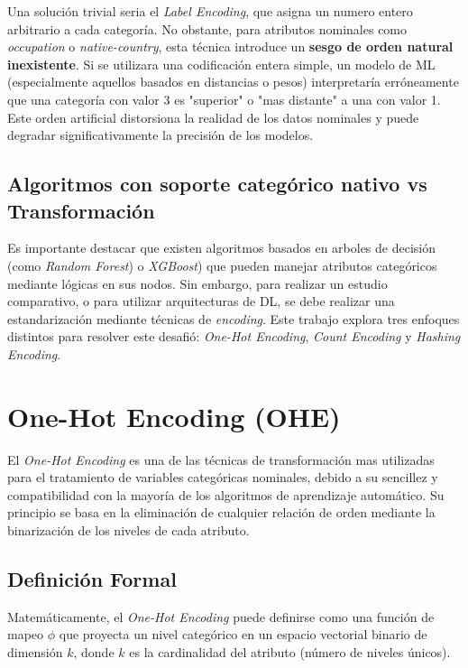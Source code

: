 \documentclass[a4paper,10pt]{book}
\begin{document}
		Una solución trivial seria el \textit{Label Encoding}, que asigna un numero entero arbitrario a cada categoría. No obstante, para atributos nominales como \textit{occupation} o \textit{native-country}, esta técnica introduce un \textbf{sesgo de orden natural inexistente}.
		Si se utilizara una codificación entera simple, un modelo de ML (especialmente aquellos basados en distancias o pesos) interpretaría erróneamente que una categoría con valor 3 es "superior" o "mas distante" a una con valor 1. Este orden artificial distorsiona la realidad de los datos nominales y puede degradar significativamente la precisión de los modelos.
	
	\subsection{Algoritmos con soporte categórico nativo vs Transformación}
	
		Es importante destacar que existen algoritmos basados en arboles de decisión (como \textit{Random Forest}) o \textit{XGBoost}) que pueden manejar atributos categóricos mediante lógicas en sus nodos. Sin embargo, para realizar un estudio comparativo, o para utilizar arquitecturas de DL, se debe realizar una estandarización mediante técnicas de \textit{encoding}.
		Este trabajo explora tres enfoques distintos para resolver este desafió: \textit{One-Hot Encoding}, \textit{Count Encoding} y \textit{Hashing Encoding}.
		
	\section{One-Hot Encoding (OHE)}
	
		El \textit{One-Hot Encoding} es una de las técnicas de transformación mas utilizadas para el tratamiento de variables categóricas nominales, debido a su sencillez y compatibilidad con la mayoría de los algoritmos de aprendizaje automático. Su principio se basa en la eliminación de cualquier relación de orden mediante la binarización de los niveles de cada atributo.
	
	\subsection{Definición Formal}

		Matemáticamente, el \textit{One-Hot Encoding} puede definirse como una función de mapeo $\phi$ que proyecta un nivel categórico en un espacio vectorial binario de dimensión $k$, donde $k$ es la cardinalidad del atributo (número de niveles únicos).
		
\end{document}
